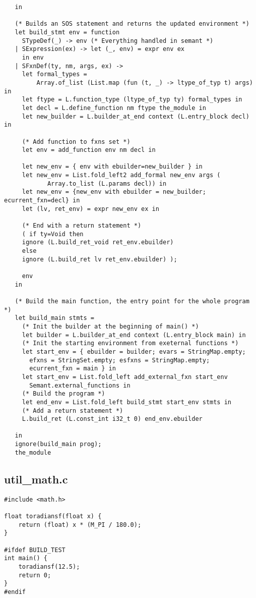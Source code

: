 \documentclass[main.tex]{subfiles}
\begin{document}
\begin{lstlisting}
   in

   (* Builds an SOS statement and returns the updated environment *)
   let build_stmt env = function
     STypeDef(_) -> env (* Everything handled in semant *)
   | SExpression(ex) -> let (_, env) = expr env ex 
     in env
   | SFxnDef(ty, nm, args, ex) ->
     let formal_types =
         Array.of_list (List.map (fun (t, _) -> ltype_of_typ t) args) in
     let ftype = L.function_type (ltype_of_typ ty) formal_types in
     let decl = L.define_function nm ftype the_module in
     let new_builder = L.builder_at_end context (L.entry_block decl) in

     (* Add function to fxns set *)
     let env = add_function env nm decl in

     let new_env = { env with ebuilder=new_builder } in
     let new_env = List.fold_left2 add_formal new_env args (
            Array.to_list (L.params decl)) in
     let new_env = {new_env with ebuilder = new_builder; ecurrent_fxn=decl} in
     let (lv, ret_env) = expr new_env ex in
     
     (* End with a return statement *)
     ( if ty=Void then
     ignore (L.build_ret_void ret_env.ebuilder)
     else
     ignore (L.build_ret lv ret_env.ebuilder) );

     env
   in
  
   (* Build the main function, the entry point for the whole program *)
   let build_main stmts = 
     (* Init the builder at the beginning of main() *)
     let builder = L.builder_at_end context (L.entry_block main) in
     (* Init the starting environment from exeternal functions *)
     let start_env = { ebuilder = builder; evars = StringMap.empty;
       efxns = StringSet.empty; esfxns = StringMap.empty; 
       ecurrent_fxn = main } in
     let start_env = List.fold_left add_external_fxn start_env
       Semant.external_functions in
     (* Build the program *)
     let end_env = List.fold_left build_stmt start_env stmts in
     (* Add a return statement *)
     L.build_ret (L.const_int i32_t 0) end_env.ebuilder    

   in
   ignore(build_main prog);
   the_module
\end{lstlisting}

\subsection{util\_math.c}
\begin{lstlisting}
#include <math.h>

float toradiansf(float x) {
    return (float) x * (M_PI / 180.0);
} 

#ifdef BUILD_TEST
int main() {
    toradiansf(12.5);
    return 0;
}
#endif
\end{lstlisting}
\end{document}
